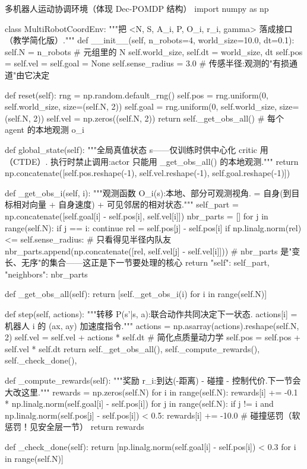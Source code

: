 \begin{codebox}[Python]{多机器人运动协调环境（体现 Dec-POMDP 结构）}
import numpy as np

class MultiRobotCoordEnv:
    """把 <N, S, {A_i}, P, {O_i}, {r_i}, gamma> 落成接口（教学简化版）."""
    def __init__(self, n_robots=4, world_size=10.0, dt=0.1):
        self.N = n_robots                  # 元组里的 N
        self.world_size, self.dt = world_size, dt
        self.pos = self.vel = self.goal = None
        self.sense_radius = 3.0            # 传感半径:观测的"有损通道"由它决定

    def reset(self):
        rng = np.random.default_rng()
        self.pos  = rng.uniform(0, self.world_size, size=(self.N, 2))
        self.goal = rng.uniform(0, self.world_size, size=(self.N, 2))
        self.vel  = np.zeros((self.N, 2))
        return self._get_obs_all()         # 每个 agent 的本地观测 o_i

    def global_state(self):
        """全局真值状态 s——仅训练时供中心化 critic 用（CTDE）.
        执行时禁止调用:actor 只能用 _get_obs_all() 的本地观测."""
        return np.concatenate([self.pos.reshape(-1),
                               self.vel.reshape(-1), self.goal.reshape(-1)])

    def _get_obs_i(self, i):
        """观测函数 O_i(s):本地、部分可观测视角.
        = 自身(到目标相对向量 + 自身速度) + 可见邻居的相对状态."""
        self_part = np.concatenate([self.goal[i] - self.pos[i], self.vel[i]])
        nbr_parts = []
        for j in range(self.N):
            if j == i:
                continue
            rel = self.pos[j] - self.pos[i]
            if np.linalg.norm(rel) <= self.sense_radius:   # 只看得见半径内队友
                nbr_parts.append(np.concatenate([rel, self.vel[j] - self.vel[i]]))
        # nbr_parts 是"变长、无序"的集合——这正是下一节要处理的核心
        return {"self": self_part, "neighbors": nbr_parts}

    def _get_obs_all(self):
        return [self._get_obs_i(i) for i in range(self.N)]

    def step(self, actions):
        """转移 P(s'|s, a):联合动作共同决定下一状态.
        actions[i] = 机器人 i 的 (ax, ay) 加速度指令."""
        actions = np.asarray(actions).reshape(self.N, 2)
        self.vel = self.vel + actions * self.dt          # 简化点质量动力学
        self.pos = self.pos + self.vel * self.dt
        return self._get_obs_all(), self._compute_rewards(), self._check_done(), {}

    def _compute_rewards(self):
        """奖励 r_i:到达(-距离) - 碰撞 - 控制代价.下一节会大改这里."""
        rewards = np.zeros(self.N)
        for i in range(self.N):
            rewards[i] += -0.1 * np.linalg.norm(self.goal[i] - self.pos[i])
            for j in range(self.N):
                if j != i and np.linalg.norm(self.pos[j] - self.pos[i]) < 0.5:
                    rewards[i] += -10.0          # 碰撞惩罚（软惩罚！见安全层一节）
        return rewards

    def _check_done(self):
        return [np.linalg.norm(self.goal[i] - self.pos[i]) < 0.3
                for i in range(self.N)]
\end{codebox}

